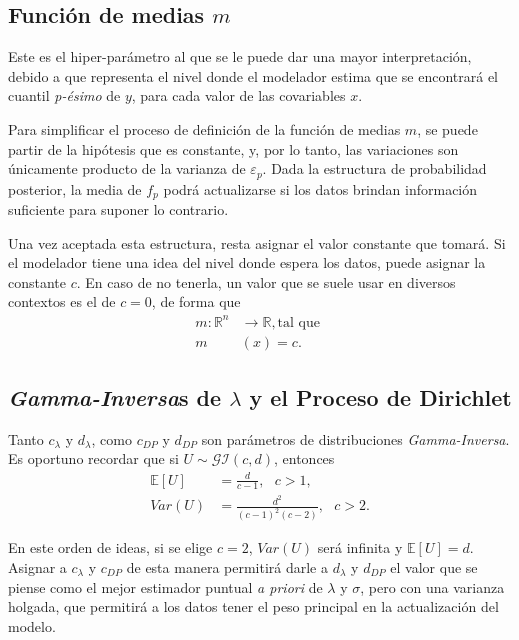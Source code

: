 \subsection{Funci\'on de medias $m$}

Este es el hiper-par\'ametro al que se le puede dar una mayor interpretaci\'on, debido a que representa el nivel donde el modelador estima que se encontrar\'a el cuantil \textit{p-\'esimo} de $y$, para cada valor de las covariables $x$.

Para simplificar el proceso de definici\'on de la funci\'on de medias $m$, se puede partir de la hip\'otesis que es constante, y, por lo tanto, las variaciones son \'unicamente producto de la varianza de $\varepsilon_p$. Dada la estructura de probabilidad posterior, la media de $f_p$ podr\'a actualizarse si los datos brindan informaci\'on suficiente para suponer lo contrario. 

Una vez aceptada esta estructura, resta asignar el valor constante que tomar\'a. Si el modelador tiene una idea del nivel donde espera los datos, puede asignar la constante $c$. En caso de no tenerla, un valor que se suele usar en diversos contextos es el de $c=0$, de forma que
\begin{equation*}
\begin{aligned}
    m:\mathbb{R}^n &\rightarrow \mathbb{R}, \text{tal que }\\
    m&(x) = c.
\end{aligned}
\end{equation*}

\subsection{\textit{Gamma-Inversa}s de $\lambda$ y el Proceso de Dirichlet}

Tanto $c_\lambda$ y $d_\lambda$, como $c_{DP}$ y $d_{DP}$ son par\'ametros de distribuciones \textit{Gamma-Inversa}. Es oportuno recordar que si $U \sim \mathcal{GI}(c,d)$, entonces
\begin{equation*}
\begin{aligned}
    \mathbb{E}[U] &= \frac{d}{c-1}, \text{ } c>1,\\
    Var(U) &= \frac{d^2}{(c-1)^2(c-2)}, \text{ } c>2.
\end{aligned}
\end{equation*}

En este orden de ideas, si se elige $c = 2$, $Var(U)$ ser\'a infinita y $\mathbb{E}[U] = d$. Asignar a $c_\lambda$ y $c_{DP}$ de esta manera permitir\'a darle a $d_\lambda$ y $d_{DP}$ el valor que se piense como el mejor estimador puntual \textit{a priori} de $\lambda$ y $\sigma$, pero con una varianza holgada, que permitir\'a a los datos tener el peso principal en la actualizaci\'on del modelo. 

